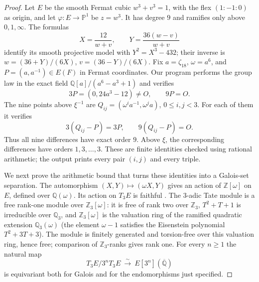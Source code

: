\documentclass[11pt,a4paper]{article}
\begin{document}
\begin{proof}
Let $E$ be the smooth Fermat cubic $w^3+v^3=1$, with the flex
$(1:-1:0)$ as origin, and let $\varphi:E\to\mathbb P^1$ be $z=w^3$.
It has degree $9$ and ramifies only above $0,1,\infty$.  The formulas
\[
 X=\frac{12}{w+v},\qquad Y=\frac{36(w-v)}{w+v}
\]
identify its smooth projective model with $Y^2=X^3-432$; their inverse is
$w=(36+Y)/(6X)$, $v=(36-Y)/(6X)$.  Fix $a=\zeta_{18}$,
$\omega=a^6$, and $P=(a,a^{-1})\in E(F)$ in Fermat coordinates.
Our program performs the group law in the exact field
$\mathbb Q[a]/(a^6-a^3+1)$ and verifies
\[
 3P=(0,24a^3-12)\ne O,\qquad9P=O.
\]
The nine points above $\xi^{-1}$ are
$Q_{ij}=(\omega^i a^{-1},\omega^j a)$, $0\leq i,j<3$.
For each of them it verifies
\[
 3(Q_{ij}-P)=3P,\qquad9(Q_{ij}-P)=O.
\]
Thus all nine differences have exact order $9$.  Above $\xi$, the
corresponding differences have orders $1,3,\ldots,3$.
These are finite identities checked using rational arithmetic; the output
prints every pair $(i,j)$ and every triple.

We next prove the arithmetic bound that turns these identities into a
Galois-set separation.  The automorphism
$(X,Y)\mapsto(\omega X,Y)$ gives an action of
$\mathbb Z[\omega]$ on $E$, defined over $\mathbb Q(\omega)$.
Its action on $T_3E$ is faithful
\cite[II, Proposition 6.7]{D_MilneEC}.
The $3$-adic Tate module is a free rank-one module over
$\mathbb Z_3[\omega]$: it is free of rank two over $\mathbb Z_3$,
$T^2+T+1$ is irreducible over $\mathbb Q_3$, and
$\mathbb Z_3[\omega]$ is the valuation ring of the ramified quadratic
extension $\mathbb Q_3(\omega)$ (the element $\omega-1$ satisfies the
Eisenstein polynomial $T^2+3T+3$).  The module is finitely generated and
torsion-free over this valuation ring, hence free; comparison of
$\mathbb Z_3$-ranks gives rank one.  For every $n\geq1$ the natural map
\[
 T_3E/3^nT_3E\ \xrightarrow{\sim}\ E[3^n](\overline{\mathbb Q})
\]
is equivariant both for Galois and for the endomorphisms just specified.


\end{proof}
\end{document}
